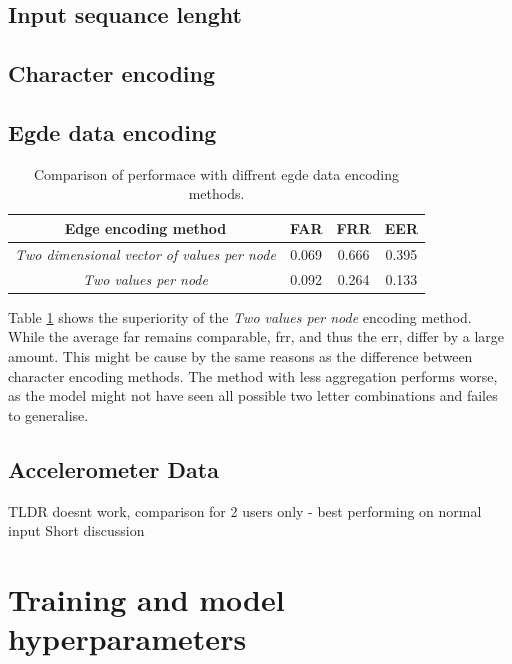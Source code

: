 \subsection{Input sequance lenght}

\subsection{Character encoding}


\subsection{Egde data encoding}

\begin{center}
	\begin{table}[H]
		\begin{center}
			\begin{tabular}{ |c|c|c|c| } 
				\hline
				Edge encoding method & FAR & FRR & EER \\
				\hline
				\textit{Two dimensional vector of values per node} & 0.069 & 0.666 & 0.395 \\
				\hline
				\textit{Two values per node} & 0.092 & 0.264 & 0.133 \\
				\hline
			\end{tabular}
		\end{center}
		\caption{Comparison of performace with diffrent egde data encoding methods.}
		\label{table:egde_encoding_comp}
	\end{table}
\end{center}

Table \ref{table:egde_encoding_comp} shows the superiority of the \textit{Two values per node} encoding method. While the average far remains comparable, frr, and thus the err, differ by a large amount. This might be cause by the same reasons as the difference between character encoding methods. The method with less aggregation performs worse, as the model might not have seen all possible two letter combinations and failes to generalise.

\subsection{Accelerometer Data}
TLDR doesnt work, comparison for 2 users only - best performing on normal input
Short discussion

\section{Training and model hyperparameters}

